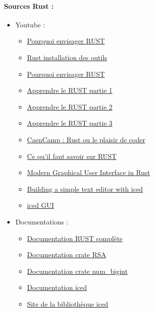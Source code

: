 \documentclass[12pt]{article} %
\begin{document}
\paragraph{Sources Rust :}  

\begin{itemize}
\item Youtube :
	\begin{itemize}
	\item \href{https://www.youtube.com/watch?v=I2iYNZm_pqg&list=PLrT8DrHsxZTiiAj96QukmAdedfRMsIPN5&index=4}{Pourquoi envisager RUST}
	\item \href{https://www.youtube.com/watch?v=lf5SEzdH_1k&list=PLrT8DrHsxZTiiAj96QukmAdedfRMsIPN5&index=5}{Rust installation des outils}
	\item \href{https://www.youtube.com/watch?v=I2iYNZm_pqg}{Pourquoi envisager RUST}
	\item \href{https://www.youtube.com/watch?v=mZasv3__A9k&list=PLrT8DrHsxZTiiAj96QukmAdedfRMsIPN5}{Apprendre le RUST partie 1}
	\item \href{https://www.youtube.com/watch?v=wgjw5lGv-EI&list=PLrT8DrHsxZTiiAj96QukmAdedfRMsIPN5&index=2}{Apprendre le RUST partie 2}
	\item \href{https://www.youtube.com/watch?v=3kBk3sjREOM&list=PLrT8DrHsxZTiiAj96QukmAdedfRMsIPN5&index=3}{Apprendre le RUST partie 3}
	\item \href{https://www.youtube.com/watch?v=68Yw_n6SySk&list=PLrT8DrHsxZTiiAj96QukmAdedfRMsIPN5&index=15}{CaenCamp : Rust ou le plaisir de coder}
	\item \href{https://www.youtube.com/watch?v=LiMZkSF2wXo}{Ce qu'il faut savoir sur RUST}
	\item \href{https://www.youtube.com/watch?v=72PyU1EIGY8}{Modern Graphical User Interface in Rust}
	\item \href{https://www.youtube.com/watch?v=gcBJ7cPSALo&t}{Building a simple text editor with iced}
	\item \href{https://www.youtube.com/watch?v=X9Hebeionj8} {iced GUI}
	\end{itemize}
\item Documentations :
	\begin{itemize}
	\item \href{https://docs.rs/}{Documentation RUST complète}
	\item \href{https://docs.rs/rsa/latest/rsa/}{Documentation crate RSA}
	\item \href{https://docs.rs/num-bigint/latest/num_bigint/}{Documentation crate num\_bigint}
	\item \href{https://docs.rs/iced/latest/iced/}{Documentation iced}
	\item \href{https://iced.rs/}{Site de la bibliothèque iced}


\end{itemize} 
	
\end{itemize}
\end{document}
